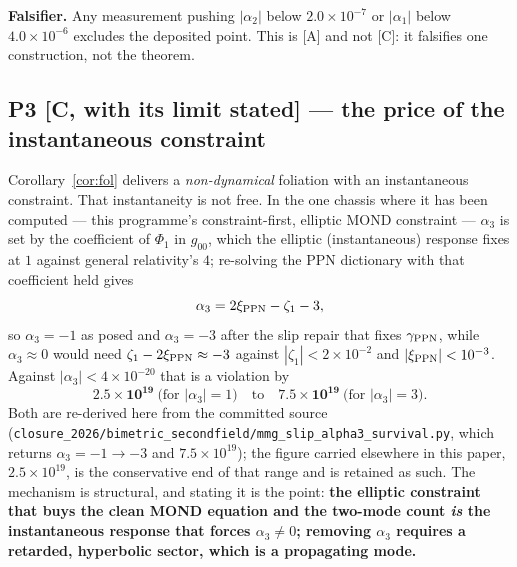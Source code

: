 \documentclass[11pt,letterpaper]{article}
\begin{document}
\textbf{Falsifier.} Any measurement pushing $|\alpha_2|$ below $2.0\times10^{-7}$ or $|\alpha_1|$ below $4.0\times10^{-6}$ excludes the deposited point. This is [A] and not [C]: it falsifies one construction, not the theorem.

\subsection{P3 [C, with its limit stated] --- the price of the instantaneous constraint}

Corollary~\ref{cor:fol} delivers a \emph{non-dynamical} foliation with an instantaneous constraint. That instantaneity is not free. In the one chassis where it has been computed --- this programme's constraint-first, elliptic MOND constraint --- $\alpha_3$ is set by the coefficient of $\Phi_1$ in $g_{00}$, which the elliptic (instantaneous) response fixes at $1$ against general relativity's $4$; re-solving the PPN dictionary with that coefficient held gives
\begin{equation}
\alpha_3=2\xi_{\rm PPN}-\zeta_1-3,
\end{equation}
so $\alpha_3=-1$ as posed and $\alpha_3=-3$ after the slip repair that fixes $\gamma_{\rm PPN}$, while $\alpha_3\approx0$ would need $\zeta_1-2\xi_{\rm PPN}\approx-3$ against $|\zeta_1|<2\times10^{-2}$ and $|\xi_{\rm PPN}|<10^{-3}$. Against $|\alpha_3|<4\times10^{-20}$ \cite{Will2014} that is a violation by
\begin{equation}
\mathbf{2.5\times10^{19}}\ \text{(for }|\alpha_3|=1\text{)}\quad\text{to}\quad\mathbf{7.5\times10^{19}}\ \text{(for }|\alpha_3|=3\text{)} .
\end{equation}
Both are re-derived here from the committed source (\texttt{closure\_2026/bimetric\_secondfield/}\allowbreak\texttt{mmg\_slip\_alpha3\_survival.py}, which returns $\alpha_3=-1\to-3$ and $7.5\times10^{19}$); the figure carried elsewhere in this paper, $2.5\times10^{19}$, is the conservative end of that range and is retained as such. The mechanism is structural, and stating it is the point: \textbf{the elliptic constraint that buys the clean MOND equation and the two-mode count \emph{is} the instantaneous response that forces $\alpha_3\neq0$; removing $\alpha_3$ requires a retarded, hyperbolic sector, which is a propagating mode.}
\end{document}
